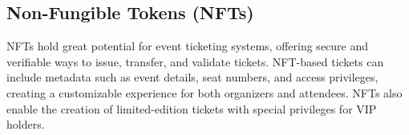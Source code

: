 \subsection{Non-Fungible Tokens (NFTs)}
\label{subsec:nfts}

NFTs hold great potential for event ticketing systems, offering secure and
verifiable ways to issue, transfer, and validate tickets. NFT-based tickets can
include metadata such as event details, seat numbers, and access privileges,
creating a customizable experience for both organizers and attendees. NFTs also
enable the creation of limited-edition tickets with special privileges for VIP
holders.
